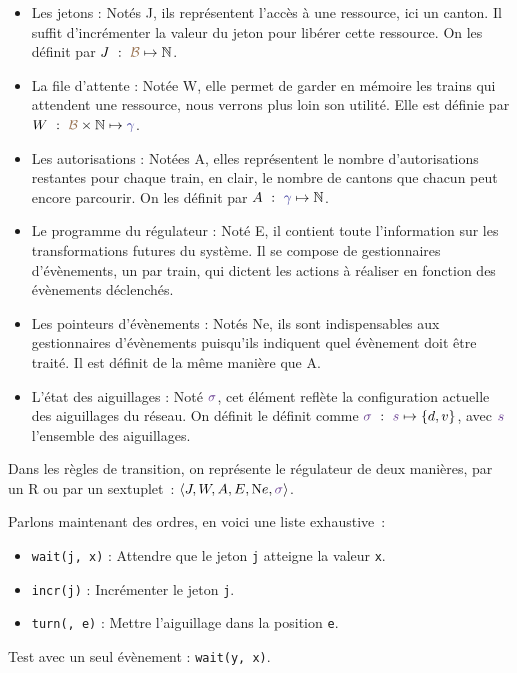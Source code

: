\documentclass[oneside, a4paper, 11pt]{book}
\newcommand{\nats}{\ensuremath{\mathbb{N}}}
\newcommand{\trainFmt}[1]{{\color{traincolor} #1}}
\newcommand{\posFmt}[1]{{\color{poscolor}{#1}}}
\newcommand{\swFmt}[1]{{\color{swcolor}{#1}}}
\begin{document}
\begin{itemize}
	\item Les jetons : Notés J, ils représentent l'accès à une ressource, ici un canton. Il suffit d'incrémenter la valeur du jeton pour libérer cette ressource.
	 On les définit par $J~:~\posFmt{\mathcal{B}} \mapsto \nats$.
	\item La file d'attente : Notée W, elle permet de garder en mémoire les trains qui attendent une ressource, nous verrons plus loin son utilité. Elle est définie par $W~:~\posFmt{\mathcal{B}} \times \nats \mapsto \trainFmt{\gamma}$.
	\item Les autorisations : Notées A, elles représentent le nombre d'autorisations restantes pour chaque train, en clair, le nombre de cantons que chacun peut encore parcourir.
	 On les définit par $A~:~\trainFmt{\gamma} \mapsto \nats$.
	\item Le programme du régulateur : Noté E, il contient toute l'information sur les transformations futures du système. 
	 Il se compose de gestionnaires d'évènements, un par train, qui dictent les actions à réaliser en fonction des évènements déclenchés.
	\item Les pointeurs d'évènements : Notés Ne, ils sont indispensables aux gestionnaires d'évènements puisqu'ils indiquent quel évènement doit être traité. Il est définit de la même manière que A.
	\item L'état des aiguillages : Noté $\swFmt{\sigma}$, cet élément reflète la configuration actuelle des aiguillages du réseau. On définit le définit comme $\swFmt{\sigma}~:~\swFmt{s} \mapsto \{d, v\}$, avec $\swFmt{s}$ l'ensemble des aiguillages.
\end{itemize}
Dans les règles de transition, on représente le régulateur de deux manières, par un R ou par un sextuplet~: $\langle J,W,A,E,{\text Ne},\swFmt{\sigma} \rangle$.




Parlons maintenant des ordres, en voici une liste exhaustive~:
\begin{itemize}
	\item \texttt{wait(j, x)} : Attendre que le jeton \texttt{j} atteigne la valeur \texttt{x}.
	\item \texttt{incr(j)} : Incrémenter le jeton \texttt{j}.
	\item \texttt{turn(\swFmt{$s_i$}, e)} : Mettre l'aiguillage \swFmt{$s_i$} dans la position \texttt{e}.
\end{itemize}

\begin{example}
	Test avec un seul évènement : \texttt{wait(y, x)}.
\end{example}
\end{document}
